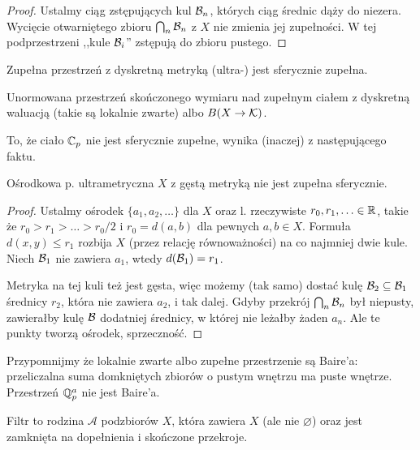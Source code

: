 \begin{proof}
	Ustalmy ciąg zstępujących kul $\mathcal B_n$, których ciąg średnic dąży do niezera.
	Wycięcie otwarniętego zbioru $\bigcap_n \mathcal B_n$ z $X$ nie zmienia jej zupełności.
	W tej podprzestrzeni ,,kule $\mathcal B_i$'' zstępują do zbioru pustego.
\end{proof}

\begin{fakt}
	Zupełna przestrzeń z dyskretną metryką (ultra-) jest sferycznie zupełna.
\end{fakt}

\begin{przyklad}
	Unormowana przestrzeń skończonego wymiaru nad zupełnym ciałem z dyskretną waluacją (takie są lokalnie zwarte) albo $B(X \to \mathcal K)$.
\end{przyklad}

To, że ciało $\mathbb C_p$ nie jest sferycznie zupełne, wynika (inaczej) z następującego faktu.

\begin{fakt}
	Ośrodkowa p. ultrametryczna $X$ z gęstą metryką nie jest zupełna sferycznie.
\end{fakt}

\begin{proof}
	Ustalmy ośrodek $\{a_1, a_2, \ldots\}$ dla $X$ oraz l. rzeczywiste $r_0, r_1,  \ldots \in \mathbb R$, takie że $r_0 > r_1 > \ldots > r_0 / 2$ i $r_0 = d(a,b)$ dla pewnych $a, b \in X$.
	Formuła $d(x,y) \le r_1$ rozbija $X$ (przez relację równoważności) na co najmniej dwie kule.
	Niech $\mathcal B_1$ nie zawiera $a_1$, wtedy $d(\mathcal B_1) = r_1$.

	Metryka na tej kuli też jest gęsta, więc możemy (tak samo) dostać kulę $\mathcal B_2 \subseteq \mathcal B_1$ średnicy $r_2$, która nie zawiera $a_2$, i tak dalej.
	Gdyby przekrój $\bigcap_n \mathcal B_n$ był niepusty, zawierałby kulę $\mathcal B$ dodatniej średnicy, w której nie leżałby żaden $a_n$.
	Ale te punkty tworzą ośrodek, sprzeczność.
\end{proof}

Przypomnijmy że lokalnie zwarte albo zupełne przestrzenie są Baire'a: przeliczalna suma domkniętych zbiorów o pustym wnętrzu ma puste wnętrze.
Przestrzeń $\mathbb Q_p^a$ nie jest Baire'a. %

\begin{definicja}
	Filtr to rodzina $\mathcal A$ podzbiorów $X$, która zawiera $X$ (ale nie $\varnothing$) oraz jest zamknięta na dopełnienia i skończone przekroje.
\end{definicja}

